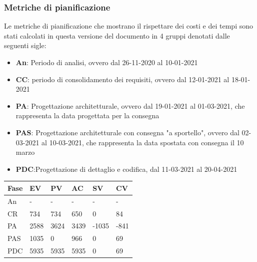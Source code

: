 \subsubsection{Metriche di pianificazione}
    Le metriche di pianificazione che mostrano il rispettare dei costi e dei tempi sono stati calcolati in questa versione del documento in 4 gruppi denotati dalle seguenti sigle:
    \begin{itemize}
        \item \textbf{An}: Periodo di analisi, ovvero dal 26-11-2020 al 10-01-2021
        \item \textbf{CC}: periodo di consolidamento dei requisiti, ovvero dal 12-01-2021 al 18-01-2021
        \item \textbf{PA}: Progettazione architetturale, ovvero dal 19-01-2021 al 01-03-2021, che rappresenta la data progettata per la consegna
        \item \textbf{PAS}: Progettazione architetturale con consegna "a sportello", ovvero dal 02-03-2021 al 10-03-2021, che rappresenta la data spostata con consegna il 10 marzo
        \item \textbf{PDC}:Progettazione di dettaglio e codifica, dal 11-03-2021 al 20-04-2021
    \end{itemize}
    
    
    \begin{longtabu} to \textwidth {| X[0.1,c m] | X[0.1,c m]| X[0.1,c m]| X[0.1,c m]| X[0.1,c m]| X[0.1,c m] |}
        \hline
        \textbf{Fase} &
        \textbf{EV} &
        \textbf{PV} &
        \textbf{AC} &
        \textbf{SV} &
        \textbf{CV} \\
        \hline
        An & - & - & - & - & -  \\ 
        \hline
        CR & 734 & 734 & 650 & 0 & 84 \\
        \hline
        PA & 2588 & 3624 & 3439 & -1035 & -841\\
        \hline
        PAS & 1035 & 0 & 966 & 0 & 69 \\
        \hline
        PDC & 5935 & 5935 & 5935 & 0 & 69 \\
        \hline 
        \end{longtabu}


